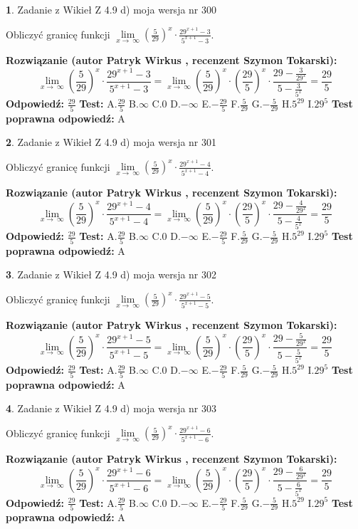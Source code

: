 \documentclass[12pt, a4paper]{article}
\theoremstyle{definition} %
\newtheorem{zad}{}
\newcommand{\zadStart}[1]{\begin{zad}#1\newline}
\newcommand{\zadStop}{\end{zad}}
\newcommand{\rozwStart}[2]{\noindent \textbf{Rozwiązanie (autor #1 , recenzent #2): }\newline}
\newcommand{\rozwStop}{\newline}
\newcommand{\odpStart}{\noindent \textbf{Odpowiedź:}\newline}
\newcommand{\odpStop}{\newline}
\newcommand{\testStart}{\noindent \textbf{Test:}\newline}
\newcommand{\testStop}{\newline}
\newcommand{\kluczStart}{\noindent \textbf{Test poprawna odpowiedź:}\newline}
\newcommand{\kluczStop}{\newline}
\begin{document}
\zadStart{Zadanie z Wikieł Z 4.9 d) moja wersja nr 300}


Obliczyć granicę funkcji  $\lim\limits_{x\to\ \infty}(\frac{5}{29})^{x}\cdot\frac{29^{x+1}-3}{5^{x+1}-3}$.
\zadStop
\rozwStart{Patryk Wirkus}{Szymon Tokarski}
$$\lim\limits_{x\to\ \infty}(\frac{5}{29})^{x}\cdot\frac{29^{x+1}-3}{5^{x+1}-3}=\lim\limits_{x\to\ \infty}(\frac{5}{29})^{x}\cdot(\frac{29}{5})^{x} \cdot \frac{29-\frac{3}{29^{x}}}{5-\frac{3}{5^{x}}} = \frac{29}{5}$$
\rozwStop
\odpStart
$\frac{29}{5}$
\odpStop
\testStart
A.$\frac{29}{5}$ B.$\infty$ C.$0$ D.$-\infty$ E.$-\frac{29}{5}$
F.$\frac{5}{29}$ G.$-\frac{5}{29}$
H.$5^{29}$
I.$29^{5}$
\testStop
\kluczStart
A
\kluczStop



\zadStart{Zadanie z Wikieł Z 4.9 d) moja wersja nr 301}


Obliczyć granicę funkcji  $\lim\limits_{x\to\ \infty}(\frac{5}{29})^{x}\cdot\frac{29^{x+1}-4}{5^{x+1}-4}$.
\zadStop
\rozwStart{Patryk Wirkus}{Szymon Tokarski}
$$\lim\limits_{x\to\ \infty}(\frac{5}{29})^{x}\cdot\frac{29^{x+1}-4}{5^{x+1}-4}=\lim\limits_{x\to\ \infty}(\frac{5}{29})^{x}\cdot(\frac{29}{5})^{x} \cdot \frac{29-\frac{4}{29^{x}}}{5-\frac{4}{5^{x}}} = \frac{29}{5}$$
\rozwStop
\odpStart
$\frac{29}{5}$
\odpStop
\testStart
A.$\frac{29}{5}$ B.$\infty$ C.$0$ D.$-\infty$ E.$-\frac{29}{5}$
F.$\frac{5}{29}$ G.$-\frac{5}{29}$
H.$5^{29}$
I.$29^{5}$
\testStop
\kluczStart
A
\kluczStop



\zadStart{Zadanie z Wikieł Z 4.9 d) moja wersja nr 302}


Obliczyć granicę funkcji  $\lim\limits_{x\to\ \infty}(\frac{5}{29})^{x}\cdot\frac{29^{x+1}-5}{5^{x+1}-5}$.
\zadStop
\rozwStart{Patryk Wirkus}{Szymon Tokarski}
$$\lim\limits_{x\to\ \infty}(\frac{5}{29})^{x}\cdot\frac{29^{x+1}-5}{5^{x+1}-5}=\lim\limits_{x\to\ \infty}(\frac{5}{29})^{x}\cdot(\frac{29}{5})^{x} \cdot \frac{29-\frac{5}{29^{x}}}{5-\frac{5}{5^{x}}} = \frac{29}{5}$$
\rozwStop
\odpStart
$\frac{29}{5}$
\odpStop
\testStart
A.$\frac{29}{5}$ B.$\infty$ C.$0$ D.$-\infty$ E.$-\frac{29}{5}$
F.$\frac{5}{29}$ G.$-\frac{5}{29}$
H.$5^{29}$
I.$29^{5}$
\testStop
\kluczStart
A
\kluczStop



\zadStart{Zadanie z Wikieł Z 4.9 d) moja wersja nr 303}


Obliczyć granicę funkcji  $\lim\limits_{x\to\ \infty}(\frac{5}{29})^{x}\cdot\frac{29^{x+1}-6}{5^{x+1}-6}$.
\zadStop
\rozwStart{Patryk Wirkus}{Szymon Tokarski}
$$\lim\limits_{x\to\ \infty}(\frac{5}{29})^{x}\cdot\frac{29^{x+1}-6}{5^{x+1}-6}=\lim\limits_{x\to\ \infty}(\frac{5}{29})^{x}\cdot(\frac{29}{5})^{x} \cdot \frac{29-\frac{6}{29^{x}}}{5-\frac{6}{5^{x}}} = \frac{29}{5}$$
\rozwStop
\odpStart
$\frac{29}{5}$
\odpStop
\testStart
A.$\frac{29}{5}$ B.$\infty$ C.$0$ D.$-\infty$ E.$-\frac{29}{5}$
F.$\frac{5}{29}$ G.$-\frac{5}{29}$
H.$5^{29}$
I.$29^{5}$
\testStop
\kluczStart
A
\kluczStop
\end{document}
